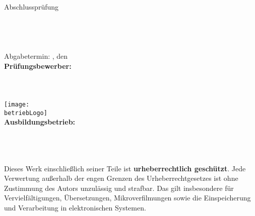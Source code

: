 \begin{titlepage}

\begin{center}
\Large{Abschlussprüfung \pruefungstermin}\\[3ex]

\Large{\ausbildungsberuf}\\
\LARGE{\betreff}\\[4ex]

\huge{\textbf{\titel}}\\[1.5ex]
\Large{\textbf{\untertitel}}\\[4ex]

\normalsize
Abgabetermin: \abgabeOrt, den \abgabeTermin\\[3em]
\textbf{Prüfungsbewerber:}\\
\autorName\\
\autorAnschrift\\
\autorOrt\\[5ex]

\texttt{[image: \\betriebLogo]}\\[2ex]
\textbf{Ausbildungsbetrieb:}\\
\betriebName\\
\betriebAnschrift\\
\betriebOrt\\[5em]
\end{center}

\small
\noindent
Dieses Werk einschließlich seiner Teile ist \textbf{urheberrechtlich geschützt}.
Jede Verwertung außerhalb der engen Grenzen des Urheberrechtgesetzes ist ohne
Zustimmung des Autors unzulässig und strafbar. Das gilt insbesondere für
Vervielfältigungen, Übersetzungen, Mikroverfilmungen sowie die Einspeicherung
und Verarbeitung in elektronischen Systemen.

\end{titlepage}

